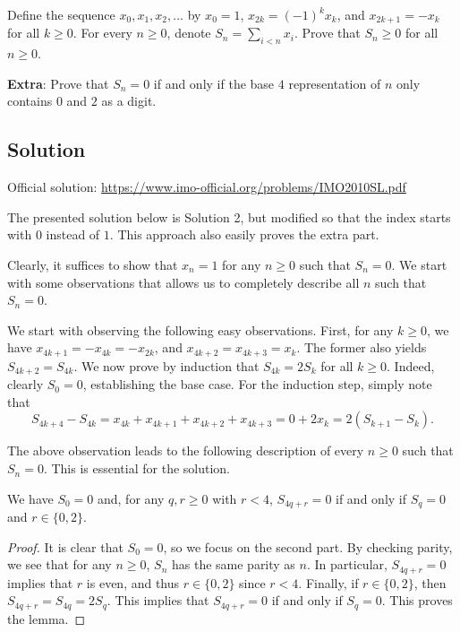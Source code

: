 Define the sequence $x_0, x_1, x_2, \ldots$ by $x_0 = 1$, $x_{2k} = (-1)^k x_k$, and $x_{2k + 1} = -x_k$ for all $k \geq 0$.
For every $n \geq 0$, denote $S_n = \displaystyle \sum_{i < n} x_i$.
Prove that $S_n \geq 0$ for all $n \geq 0$.

\textbf{Extra}: Prove that $S_n = 0$ if and only if the base $4$ representation of $n$ only contains $0$ and $2$ as a digit.



\subsection*{Solution}

Official solution: \url{https://www.imo-official.org/problems/IMO2010SL.pdf}

The presented solution below is Solution 2, but modified so that the index starts with $0$ instead of $1$.
This approach also easily proves the extra part.

Clearly, it suffices to show that $x_n = 1$ for any $n \geq 0$ such that $S_n = 0$.
We start with some observations that allows us to completely describe all $n$ such that $S_n = 0$.

We start with observing the following easy observations.
First, for any $k \geq 0$, we have $x_{4k + 1} = -x_{4k} = -x_{2k}$, and $x_{4k + 2} = x_{4k + 3} = x_k$.
The former also yields $S_{4k + 2} = S_{4k}$.
We now prove by induction that $S_{4k} = 2 S_k$ for all $k \geq 0$.
Indeed, clearly $S_0 = 0$, establishing the base case.
For the induction step, simply note that
\[ S_{4k + 4} - S_{4k} = x_{4k} + x_{4k + 1} + x_{4k + 2} + x_{4k + 3} = 0 + 2 x_k = 2 (S_{k + 1} - S_k). \]

The above observation leads to the following description of every $n \geq 0$ such that $S_n = 0$.
This is essential for the solution.

\begin{lemma}\label{2010a4-1}
We have $S_0 = 0$ and, for any $q, r \geq 0$ with $r < 4$, $S_{4q + r} = 0$ if and only if $S_q = 0$ and $r \in \{0, 2\}$.
\end{lemma}
\begin{proof}
It is clear that $S_0 = 0$, so we focus on the second part.
By checking parity, we see that for any $n \geq 0$, $S_n$ has the same parity as $n$.
In particular, $S_{4q + r} = 0$ implies that $r$ is even, and thus $r \in \{0, 2\}$ since $r < 4$.
Finally, if $r \in \{0, 2\}$, then $S_{4q + r} = S_{4q} = 2 S_q$.
This implies that $S_{4q + r} = 0$ if and only if $S_q = 0$.
This proves the lemma.
\end{proof}


